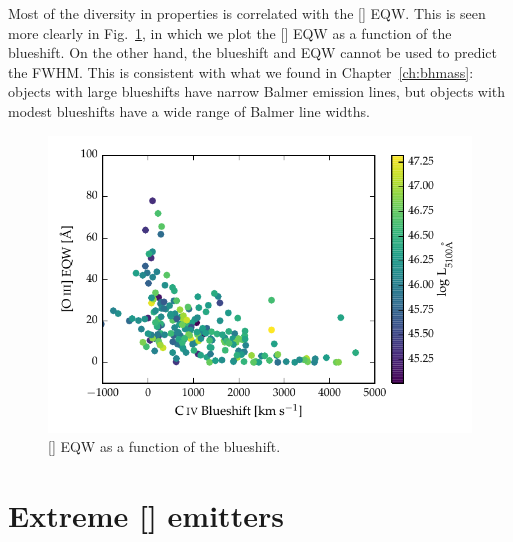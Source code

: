 Most of the diversity in  properties is correlated with the [] EQW. 
This is seen more clearly in Fig.~\ref{fig:civ_blueshift_oiii_eqw}, in which we plot the [] EQW as a function of the  blueshift. 
On the other hand, the  blueshift and EQW cannot be used to predict the \hb FWHM. 
This is consistent with what we found in Chapter~\ref{ch:bhmass}: objects with large  blueshifts have narrow Balmer emission lines, but objects with modest  blueshifts have a wide range of Balmer line widths. 

\begin{figure}
    \centering
    \includegraphics[width=\columnwidth]{figures/chapter04/civ_blueshift_oiii_eqw.pdf} 
    \caption[{[] EQW as a function of the  blueshift.}]{[] EQW as a function of the  blueshift.}     
    \label{fig:civ_blueshift_oiii_eqw}
\end{figure}

\section{Extreme [] emitters}
\label{sec:extreme_oiii}

